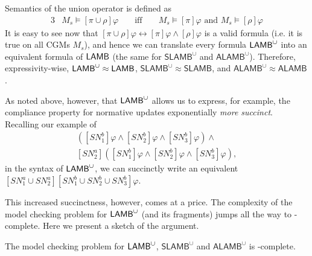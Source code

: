 Semantics of the union operator is defined as 
  \begin{alignat*}{3}
        &M_s \models [\pi \cup \rho] \varphi && \text{ iff } &&M_s \models [\pi] \varphi \text{ and } M_s \models [\rho] \varphi
\end{alignat*} 
It is easy to see now that $[\pi \cup \rho] \varphi \leftrightarrow [\pi] \varphi \land [\rho] \varphi$ is a valid formula (i.e. it is true on all CGMs $M_s$), and hence we can translate every formula $\mathsf{LAMB}^\cup$ into an equivalent formula of $\mathsf{LAMB}$ (the same for $\mathsf{SLAMB}^\cup$ and $\mathsf{ALAMB}^\cup$). Therefore, expressivity-wise, $\mathsf{LAMB}^\cup \approx \mathsf{LAMB}$, $\mathsf{SLAMB}^\cup \approx \mathsf{SLAMB}$, and $\mathsf{ALAMB}^\cup \approx \mathsf{ALAMB}$.

As noted above, however, that $\mathsf{LAMB}^\cup$ allows us to express, for example, the compliance property for normative updates exponentially \textit{more succinct}. Recalling our example of \begin{gather*}
[\mathit{SN}_1^a]([\mathit{SN}_1^b]\varphi \land [\mathit{SN}_2^b]\varphi \land [\mathit{SN}_3^b]\varphi) \land \\
[\mathit{SN}_2^a]([\mathit{SN}_1^b]\varphi \land [\mathit{SN}_2^b]\varphi \land [\mathit{SN}_3^b]\varphi),
\end{gather*} in the syntax of $\mathsf{LAMB}^\cup$, we can succinctly write an equivalent $[\mathit{SN}_1^a \cup \mathit{SN}_2^a][\mathit{SN}_1^b \cup \mathit{SN}_2^b \cup \mathit{SN}_3^b]\varphi$.

This increased succinctness, however, comes at a price. The complexity of the model checking problem for $\mathsf{LAMB}^\cup$ (and its fragments) jumps all the way to \Pspace-complete. Here we present a sketch of the argument.

\begin{theorem}
\label{lambcupMC}
    The model checking problem for $\mathsf{LAMB}^\cup$, $\mathsf{SLAMB}^\cup$ and $\mathsf{ALAMB}^\cup$ is \Pspace-complete.
\end{theorem}

